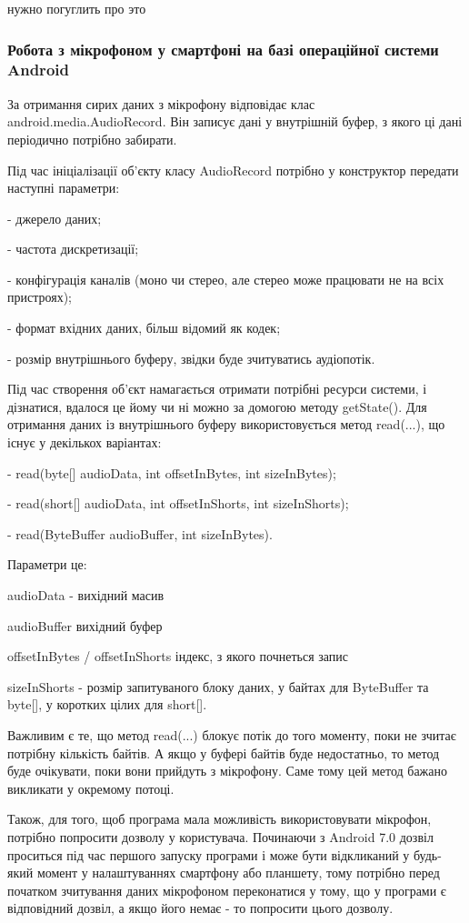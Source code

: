 нужно погуглить про это

\subsubsection{Робота з мікрофоном у смартфоні на базі операційної системи Android}

За отримання сирих даних з мікрофону відповідає клас android.media.AudioRecord. Він записує дані у внутрішній буфер, з якого ці дані періодично потрібно забирати.

Під час ініціалізації об'єкту класу AudioRecord потрібно у конструктор передати наступні параметри:

- джерело даних;

- частота дискретизації;

- конфігурація каналів (моно чи стерео, але стерео може працювати не на всіх 
пристроях);

- формат вхідних даних, більш відомий як кодек;

- розмір внутрішнього буферу, звідки буде зчитуватись аудіопотік.

Під час створення об'єкт намагається отримати потрібні ресурси системи, і дізнатися, вдалося це йому чи ні можно за домогою методу getState(). Для отримання даних із внутрішнього буферу використовується метод read(...), що існує у декількох варіантах:

- read(byte[] audioData, int offsetInBytes, int sizeInBytes);

- read(short[] audioData, int offsetInShorts, int sizeInShorts);

- read(ByteBuffer audioBuffer, int sizeInBytes).

Параметри це:

audioData - вихідний масив

audioBuffer	вихідний буфер

offsetInBytes / offsetInShorts	індекс, з якого почнеться запис

sizeInShorts - розмір запитуваного блоку даних, у байтах для ByteBuffer та byte[], у коротких цілих для short[].

Важливим є те, що метод read(...) блокує потік до того моменту, поки не зчитає потрібну кількість байтів. А якщо у буфері байтів буде недостатньо, то метод буде очікувати, поки вони прийдуть з мікрофону. Саме тому цей метод бажано викликати у окремому потоці.

Також, для того, щоб програма мала можливість використовувати мікрофон, потрібно попросити дозволу у користувача. Починаючи з Android 7.0 дозвіл проситься під час першого запуску програми і може бути відкликаний у будь-який момент у налаштуваннях смартфону або планшету, тому потрібно перед початком зчитування даних мікрофоном переконатися у тому, що у програми є відповідний дозвіл, а якщо його немає - то попросити цього дозволу.

